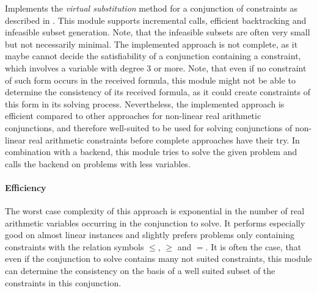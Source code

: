 Implements the \emph{virtual substitution} method for a conjunction of constraints as described in \cite{}. This module supports incremental calls, efficient backtracking and infeasible subset generation. Note, that the infeasible subsets are often very small but not necessarily minimal. The implemented approach is not complete, as it maybe cannot decide the satisfiability of a conjunction containing a constraint, which involves a variable with degree $3$ or more. Note, that even if no constraint of such form occurs in the received formula, this module might not be able to determine the consistency of its received formula, as it could create constraints of this form in its solving process. Nevertheless, the implemented approach is efficient compared to other approaches for non-linear real arithmetic conjunctions, and therefore well-suited to be used for solving conjunctions of non-linear real arithmetic constraints before complete approaches have their try. In combination with a backend, this module tries to solve the given problem and calls the backend on problems with less variables.

\paragraph{Efficiency} The worst case complexity of this approach is exponential in the number of real arithmetic variables occurring in the conjunction to solve. It performs especially good on almost linear instances and slightly prefers problems only containing constraints with the relation symbols $\leq$, $\geq$ and $=$. It is often the case, that even if the conjunction to solve contains many not suited constraints, this module can determine the consistency on the basis of a well suited subset of the constraints in this conjunction.